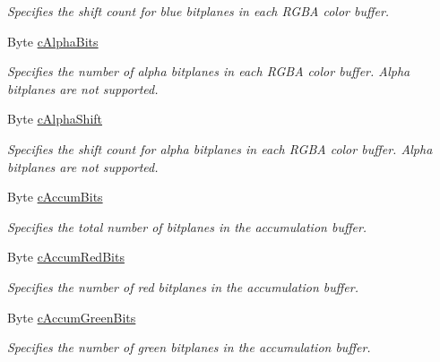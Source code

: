 \begin{DoxyCompactItemize}
\begin{DoxyCompactList}\small\item\em Specifies the shift count for blue bitplanes in each RGBA color buffer. \item\end{DoxyCompactList}\item 
Byte \hyperlink{struct_tao_1_1_platform_1_1_windows_1_1_gdi_1_1_p_i_x_e_l_f_o_r_m_a_t_d_e_s_c_r_i_p_t_o_r_acd4c882b125ec4272cf913f6f634e2ed}{cAlphaBits}
\begin{DoxyCompactList}\small\item\em Specifies the number of alpha bitplanes in each RGBA color buffer. Alpha bitplanes are not supported. \item\end{DoxyCompactList}\item 
Byte \hyperlink{struct_tao_1_1_platform_1_1_windows_1_1_gdi_1_1_p_i_x_e_l_f_o_r_m_a_t_d_e_s_c_r_i_p_t_o_r_a8ca4af8bb308e33de59a7004667c7b26}{cAlphaShift}
\begin{DoxyCompactList}\small\item\em Specifies the shift count for alpha bitplanes in each RGBA color buffer. Alpha bitplanes are not supported. \item\end{DoxyCompactList}\item 
Byte \hyperlink{struct_tao_1_1_platform_1_1_windows_1_1_gdi_1_1_p_i_x_e_l_f_o_r_m_a_t_d_e_s_c_r_i_p_t_o_r_acaa9ebd6993b6d6058dd11739868c964}{cAccumBits}
\begin{DoxyCompactList}\small\item\em Specifies the total number of bitplanes in the accumulation buffer. \item\end{DoxyCompactList}\item 
Byte \hyperlink{struct_tao_1_1_platform_1_1_windows_1_1_gdi_1_1_p_i_x_e_l_f_o_r_m_a_t_d_e_s_c_r_i_p_t_o_r_ab4cf46554fac9447711cfbdfb302e45f}{cAccumRedBits}
\begin{DoxyCompactList}\small\item\em Specifies the number of red bitplanes in the accumulation buffer. \item\end{DoxyCompactList}\item 
Byte \hyperlink{struct_tao_1_1_platform_1_1_windows_1_1_gdi_1_1_p_i_x_e_l_f_o_r_m_a_t_d_e_s_c_r_i_p_t_o_r_a4ee69f197d75c41060f031b4189768a4}{cAccumGreenBits}
\begin{DoxyCompactList}\small\item\em Specifies the number of green bitplanes in the accumulation buffer. \item\end{DoxyCompactList}\item 

\end{DoxyCompactItemize}
